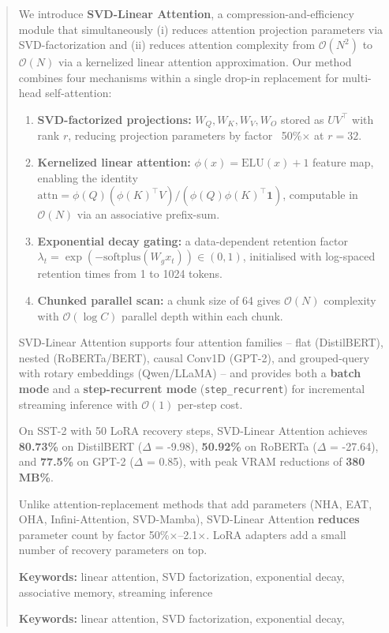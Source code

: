 \documentclass{article}
\begin{document}
\maketitle

\begin{abstract}
We introduce \textbf{SVD-Linear Attention}, a compression-and-efficiency module that 
simultaneously (i) reduces attention projection parameters via SVD-factorization 
and (ii) reduces attention complexity from $\mathcal{O}(N^2)$ to $\mathcal{O}(N)$ 
via a kernelized linear attention approximation. Our method combines four 
mechanisms within a single drop-in replacement for multi-head self-attention:

\begin{enumerate}
\item \textbf{SVD-factorized projections:} $W_Q, W_K, W_V, W_O$ stored as $U V^\top$
  with rank $r$, reducing projection parameters by factor ~50\%$\times$ at
  $r = 32$.
\item \textbf{Kernelized linear attention:} $\phi(x) = \text{ELU}(x) + 1$ feature map,
  enabling the identity
  $\text{attn} = \phi(Q)(\phi(K)^\top V) / (\phi(Q) \phi(K)^\top \mathbf{1})$,
  computable in $\mathcal{O}(N)$ via an associative prefix-sum.
\item \textbf{Exponential decay gating:} a data-dependent retention factor
  $\lambda_t = \exp(-\text{softplus}(W_g x_t)) \in (0, 1)$, initialised with
  log-spaced retention times from 1 to 1024 tokens.
\item \textbf{Chunked parallel scan:} a chunk size of 64 gives $\mathcal{O}(N)$
  complexity with $\mathcal{O}(\log C)$ parallel depth within each chunk.

\end{enumerate}
SVD-Linear Attention supports four attention families -- flat (DistilBERT), 
nested (RoBERTa/BERT), causal Conv1D (GPT-2), and grouped-query with rotary 
embeddings (Qwen/LLaMA) -- and provides both a \textbf{batch mode} and a 
\textbf{step-recurrent mode} (\texttt{step\_recurrent}) for incremental streaming inference 
with $\mathcal{O}(1)$ per-step cost.

On SST-2 with 50 LoRA recovery steps, SVD-Linear Attention 
achieves \textbf{80.73\%} on DistilBERT ($\Delta$ = -9.98), \textbf{50.92\%} on 
RoBERTa ($\Delta$ = -27.64), and \textbf{77.5\%} on GPT-2 ($\Delta$ = 0.85), 
with peak VRAM reductions of \textbf{380 MB\%}.

Unlike attention-replacement methods that add parameters (NHA, EAT, OHA, 
Infini-Attention, SVD-Mamba), SVD-Linear Attention \textbf{reduces} parameter count 
by factor 50\%$\times$--2.1$\times$. LoRA adapters add a small number of 
recovery parameters on top.

\textbf{Keywords:} linear attention, SVD factorization, exponential decay, 
associative memory, streaming inference



\vspace{0.5em}
\noindent\textbf{Keywords:} linear attention, SVD factorization, exponential decay,
\end{abstract}
\end{document}
